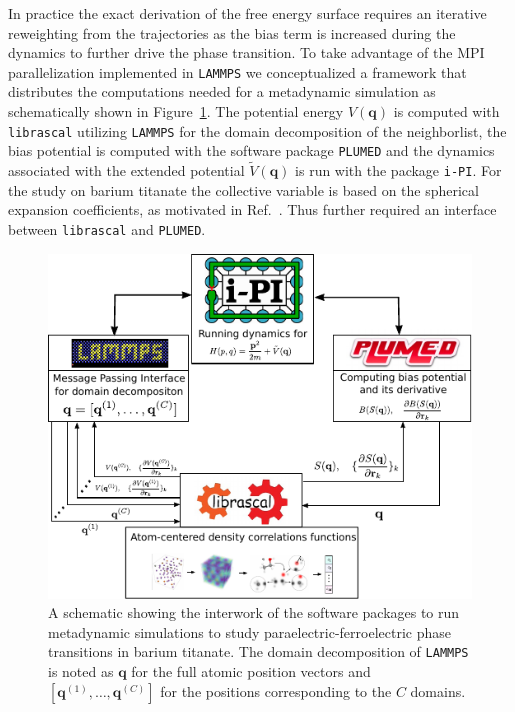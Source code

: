 In practice the exact derivation of the free energy surface requires an iterative reweighting from the trajectories as the bias term is increased during the dynamics to further drive the phase transition.
To take advantage of the MPI parallelization implemented in \texttt{LAMMPS} we conceptualized a framework that distributes the computations needed for a metadynamic simulation as schematically shown in Figure~\ref{fig:ipi-librascal-plumed}.
The potential energy $V(\mathbf{q})$ is computed with \texttt{librascal} utilizing \texttt{LAMMPS} for the domain decomposition of the neighborlist, the bias potential is computed with the software package \texttt{PLUMED} and the dynamics associated with the extended potential $\tilde{V}(\mathbf{q})$ is run with the package \texttt{i-PI}.
For the study on barium titanate the collective variable is based on the spherical expansion coefficients, as motivated in Ref.~\cite{gigli_thermodynamics_2022}.
Thus further required an interface between \texttt{librascal} and \texttt{PLUMED}.

\begin{figure}
    \includegraphics[width=\textwidth]{fig/ipi-librascal-plumed.pdf}
    \caption{A schematic showing the interwork of the software packages to run metadynamic simulations to study paraelectric-ferroelectric phase transitions in barium titanate. The domain decomposition of \texttt{LAMMPS} is noted as $\mathbf{q}$ for the full atomic position vectors and $[\mathbf{q}^{(1)},\ldots, \mathbf{q}^{(C)}]$ for the positions corresponding to the $C$ domains.} 
    \label{fig:ipi-librascal-plumed}
\end{figure}

